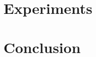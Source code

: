 \documentclass[journal]{IEEEtran}
\begin{document}
    \section{Experiments}       \label{sec:Experiments}     

    \section{Conclusion}        \label{sec:Conclusion}      

    \ifCLASSOPTIONcaptionsoff
      \newpage
    \fi

    \begin{spacing}{0.84}
        \small
        
        
    \end{spacing}
\end{document}
